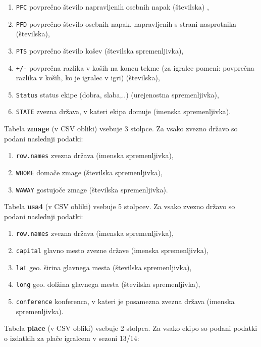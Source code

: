 \documentclass[11pt,a4paper]{article}
\begin{document}
\begin{enumerate}
\item{\verb|PFC| povprečno število napravljenih osebnih napak (številska) ,}
\item{\verb|PFD| povprečno število osebnih napak, napravljenih s strani nasprotnika (številska),}
\item{\verb|PTS| povprečno število košev (številska spremenljivka),}
\item{\verb|+/-| povprečna razlika v koših na koncu tekme (za igralce pomeni: povprečna razlika v koših, ko je igralec v igri) (številska),}
\item{\verb|Status| status ekipe (dobra, slaba,..) (urejenostna spremenljivka),}
\item{\verb|STATE| zvezna država, v kateri ekipa domuje (imenska spremenljivka).}
\end{enumerate}

\smallskip

Tabela \textbf{zmage} (v CSV obliki) vsebuje 3 stolpce. Za vsako zvezno državo so podani naslednji podatki:

\begin{enumerate}
\item{\verb|row.names| zvezna država (imenska spremenljivka),}
\item{\verb|WHOME| domače zmage (številska spremenljivka),}
\item{\verb|WAWAY| gostujoče zmage (številska spremenljivka).}
\end{enumerate}

\smallskip
Tabela \textbf{usa4} (v CSV obliki) vsebuje 5 stolpcev. Za vsako zvezno državo so podani naslednji podatki:

\begin{enumerate}
\item{\verb|row.names| zvezna država (imenska spremenljivka),}
\item{\verb|capital| glavno mesto zvezne države (imenska spremenljivka),}
\item{\verb|lat| geo. širina glavnega mesta (številska spremenljivka),}
\item{\verb|long| geo. dolžina glavnega mesta (številska spremenljivka),}
\item{\verb|conference| konferenca, v kateri je posamezna zvezna država (imenska spremenljivka).}
\end{enumerate}

\smallskip
Tabela \textbf{place} (v CSV obliki) vsebuje 2 stolpca. Za vsako ekipo so podani podatki o izdatkih za plače igralcem v sezoni 13/14:
\end{document}
